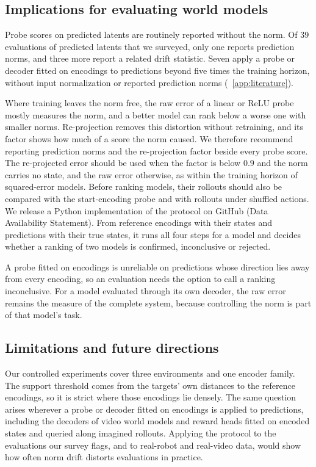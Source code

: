 \subsection{Implications for evaluating world models}
Probe scores on predicted latents are routinely reported without the norm. Of $39$ evaluations of predicted latents that we surveyed, only one reports prediction norms, and three more report a related drift statistic. Seven apply a probe or decoder fitted on encodings to predictions beyond five times the training horizon, without input normalization or reported prediction norms (\supsec~\ref{app:literature}).

Where training leaves the norm free, the raw error of a linear or ReLU probe mostly measures the norm, and a better model can rank below a worse one with smaller norms. Re-projection removes this distortion without retraining, and its factor shows how much of a score the norm caused. We therefore recommend reporting prediction norms and the re-projection factor beside every probe score. The re-projected error should be used when the factor is below $0.9$ and the norm carries no state, and the raw error otherwise, as within the training horizon of squared-error models. Before ranking models, their rollouts should also be compared with the start-encoding probe and with rollouts under shuffled actions. We release a Python implementation of the protocol on GitHub (Data Availability Statement). From reference encodings with their states and predictions with their true states, it runs all four steps for a model and decides whether a ranking of two models is confirmed, inconclusive or rejected.

A probe fitted on encodings is unreliable on predictions whose direction lies away from every encoding, so an evaluation needs the option to call a ranking inconclusive. For a model evaluated through its own decoder, the raw error remains the measure of the complete system, because controlling the norm is part of that model's task.

\subsection{Limitations and future directions}
\label{sec:limitations}
\label{sec:future}
Our controlled experiments cover three environments and one encoder family. The support threshold comes from the targets' own distances to the reference encodings, so it is strict where those encodings lie densely. The same question arises wherever a probe or decoder fitted on encodings is applied to predictions, including the decoders of video world models and reward heads fitted on encoded states and queried along imagined rollouts. Applying the protocol to the evaluations our survey flags, and to real-robot and real-video data, would show how often norm drift distorts evaluations in practice.

